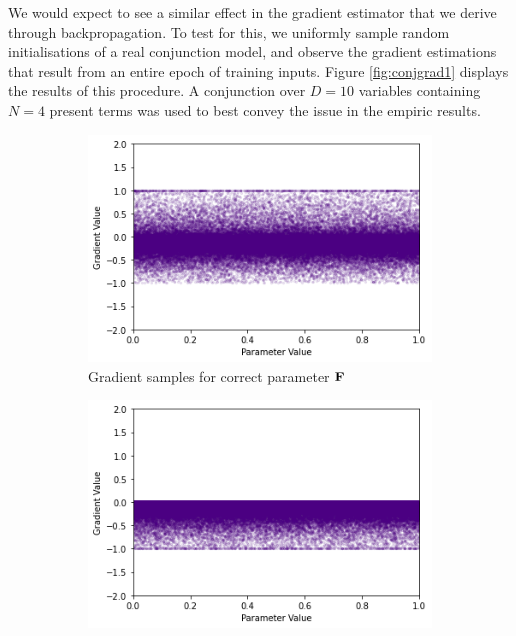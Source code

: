 We would expect to see a similar effect in the gradient estimator that we derive through backpropagation. To test for this, we uniformly sample random initialisations of a real conjunction model, and observe the gradient estimations that result from an entire epoch of training inputs. Figure \ref{fig:conjgrad1} displays the results of this procedure. A conjunction over $D=10$ variables containing $N=4$ present terms was used to best convey the issue in the empiric results.

\begin{figure}[H]
    \centering
    \begin{subfigure}[b]{0.47\textwidth}
        \centering
        \includegraphics[width=\textwidth]{imgs/grad_prod_1_falseparam.png}
        \caption{Gradient samples for correct parameter $\textbf{F}$}
        \label{fig:conjgrad1false}
    \end{subfigure}
    \begin{subfigure}[b]{0.47\textwidth}
        \centering
        \includegraphics[width=\textwidth]{imgs/grad_prod_1_trueparam.png}

\end{subfigure}
\end{figure}
